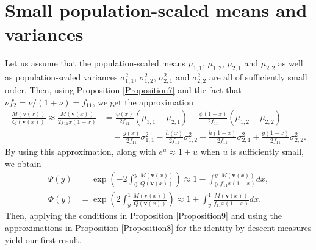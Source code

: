 \documentclass[11pt]{article}
\begin{document}

\section{Small population-scaled means and variances  }

Let us  assume that the population-scaled means $\mu_{1,1}$, $\mu_{1,2}$, $\mu_{2,1}$ and $\mu_{2,2}$ as well as population-scaled variances $\sigma_{1,1}^2$, $\sigma_{1,2}^2$, $\sigma_{2,1}^2$ and $\sigma_{2,2}^2$ are all of sufficiently small order. 
Then, using Proposition \ref{Proposition7} and the fact that $\nu f_2=\nu/(1+\nu)=f_{11}$, we get the approximation
\begin{align}\label{sec1-case5-eq1}
\frac{M(\mathbf{v}(x))}{Q(\mathbf{v}(x))}\approx\frac{M(\mathbf{v}(x))}{2f_{11}x(1-x)}&=\frac{\psi(x)}{2f_{11}}(\mu_{1,1}-\mu_{2,1})+\frac{\psi(1-x)}{2f_{11}}(\mu_{1,2}-\mu_{2,2})
\nonumber\\
&\quad-\frac{g(x)}{2f_{11}}\sigma_{1,1}^2-\frac{h(x)}{2f_{11}}\sigma_{1,2}^2+\frac{h(1-x)}{2f_{11}}\sigma_{2,1}^2+\frac{g(1-x)}{2f_{11}}\sigma_{2,2}^2.
\end{align}
By using this approximation, along with $e^{u}\approx 1+u$  when $u$ is sufficiently small, we obtain
\begin{subequations}\label{sec1-case5-eq2}
\begin{align}
\Psi(y)&=\exp\left(-2\int_{0}^{y}\frac{M(\mathbf{v}(x))}{Q(\mathbf{v}(x))}\right)\approx 1-\int_{0}^{y}\frac{M(\mathbf{v}(x))}{f_{11}x(1-x)}dx,\\
\Phi(y)&=\exp\left(2\int_{y}^{1}\frac{M(\mathbf{v}(x))}{Q(\mathbf{v}(x))}\right)\approx 1+\int_{y}^{1}\frac{M(\mathbf{v}(x))}{f_{11}x(1-x)}dx.
\end{align}
\end{subequations}
Then, applying the conditions in Proposition \ref{Proposition9} and using the approximations in Proposition \ref{Proposition8} for the identity-by-descent measures yield our first result.
\end{document}
